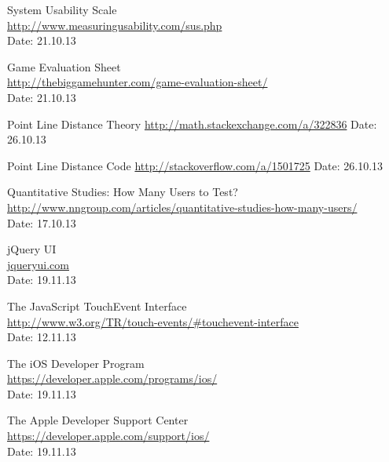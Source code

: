 \begin{thebibliography}{99}
	System Usability Scale \\
	\href {http://www.measuringusability.com/sus.php}{http://www.measuringusability.com/sus.php} \\
	Date: 21.10.13 

	Game Evaluation Sheet \\
	\href {http://thebiggamehunter.com/game-evaluation-sheet/}{http://thebiggamehunter.com/game-evaluation-sheet/} \\
	Date: 21.10.13


	Point Line Distance Theory\newline
	\href {http://math.stackexchange.com/a/322836}{http://math.stackexchange.com/a/322836}\newline
	Date: 26.10.13

	Point Line Distance Code\newline
	\href {http://stackoverflow.com/a/1501725}{http://stackoverflow.com/a/1501725}\newline
	Date: 26.10.13

	Quantitative Studies: How Many Users to Test? \\
	\href {http://www.nngroup.com/articles/quantitative-studies-how-many-users/}{http://www.nngroup.com/articles/quantitative-studies-how-many-users/} \\
	Date: 17.10.13


	jQuery UI \\
	\href{http://jqueryui.com/}{jqueryui.com} \\
	Date: 19.11.13

  The JavaScript TouchEvent Interface \\
  \href {http://www.w3.org/TR/touch-events/\#touchevent-interface}{http://www.w3.org/TR/touch-events/\#touchevent-interface} \\
  Date: 12.11.13


  The iOS Developer Program \\
  \href {https://developer.apple.com/programs/ios/}{https://developer.apple.com/programs/ios/} \\
  Date: 19.11.13

  The Apple Developer Support Center \\
  \href {https://developer.apple.com/support/ios/}{https://developer.apple.com/support/ios/} \\
  Date: 19.11.13

\end{thebibliography}
\endgroup
